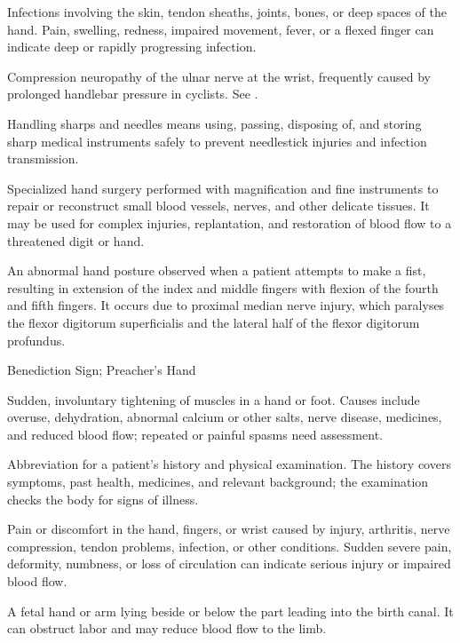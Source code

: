  Infections involving the skin, tendon sheaths, joints, bones, or deep spaces of the hand. Pain, swelling, redness, impaired movement, fever, or a flexed finger can indicate deep or rapidly progressing infection.

 Compression neuropathy of the ulnar nerve at the wrist, frequently caused by prolonged handlebar pressure in cyclists. See .

 Handling sharps and needles means using, passing, disposing of, and storing sharp medical instruments safely to prevent needlestick injuries and infection transmission.

 Specialized hand surgery performed with magnification and fine instruments to repair or reconstruct small blood vessels, nerves, and other delicate tissues. It may be used for complex injuries, replantation, and restoration of blood flow to a threatened digit or hand.

 An abnormal hand posture observed when a patient attempts to make a fist, resulting in extension of the index and middle fingers with flexion of the fourth and fifth fingers. It occurs due to proximal median nerve injury, which paralyses the flexor digitorum superficialis and the lateral half of the flexor digitorum profundus.

\synonyms
Benediction Sign; Preacher's Hand

 Sudden, involuntary tightening of muscles in a hand or foot. Causes include overuse, dehydration, abnormal calcium or other salts, nerve disease, medicines, and reduced blood flow; repeated or painful spasms need assessment.

 Abbreviation for a patient’s history and physical examination. The history covers symptoms, past health, medicines, and relevant background; the examination checks the body for signs of illness.

 Pain or discomfort in the hand, fingers, or wrist caused by injury, arthritis, nerve compression, tendon problems, infection, or other conditions. Sudden severe pain, deformity, numbness, or loss of circulation can indicate serious injury or impaired blood flow.

 A fetal hand or arm lying beside or below the part leading into the birth canal. It can obstruct labor and may reduce blood flow to the limb.


